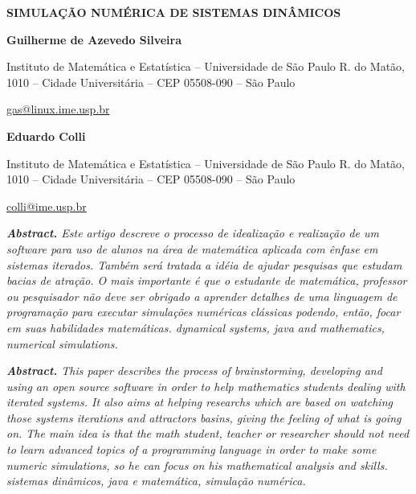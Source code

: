 \documentclass[a4paper,12pt]{article}
\begin{document}
\clearpage\pagestyle{Standard}
{\centering{}\bfseries
SIMULA\c{C}\~AO NUM\'ERICA DE SISTEMAS DIN\^AMICOS
\par}


\bigskip

{\centering{}\bfseries
Guilherme de Azevedo Silveira
\par}

{\centering{}
Instituto de Matem\'atica e Estat\'istica {--} Universidade de S\~ao
Paulo\newline
R. do Mat\~ao, 1010 {--} Cidade Universit\'aria {--} CEP 05508{}-090
{--} S\~ao Paulo
\par}

{\centering{}
\href{mailto:gas@linux.ime.usp.br}{gas@linux.ime.usp.br}
\par}

{\centering{}\bfseries
Eduardo Colli
\par}

{\centering{}
Instituto de Matem\'atica e Estat\'istica {--} Universidade de S\~ao
Paulo\newline
R. do Mat\~ao, 1010 {--} Cidade Universit\'aria {--} CEP 05508{}-090
{--} S\~ao Paulo
\par}

{\centering{}
\href{mailto:colli@ime.usp.br}{\foreignlanguage{english}{colli@ime.usp.br}}
\par}


\bigskip

{\itshape
\textbf{Abstract. }\textmd{Este artigo descreve o processo de
idealiza\c{c}\~ao e realiza\c{c}\~ao de um software para uso de alunos
na \'area de matem\'atica aplicada com \^enfase em sistemas iterados.
Tamb\'em ser\'a tratada a id\'eia de ajudar pesquisas que estudam
bacias de atra\c{c}\~ao. O mais importante \'e que o estudante de
matem\'atica, professor ou pesquisador n\~ao deve ser obrigado a
aprender detalhes de uma linguagem de programa\c{c}\~ao para executar
simula\c{c}\~oes num\'ericas cl\'assicas podendo, ent\~ao, focar em
suas habilidades matem\'aticas. dynamical systems, java and
mathematics, numerical simulations.}}

{\itshape
\textbf{Abstract. }This paper describes the process of brainstorming,
developing and using an open source software in order to help
mathematics students dealing with iterated systems. It also aims at
helping researchs which are based on watching those
system{\textquotesingle}s iterations and attractors basins, giving the
feeling of what is going on. The main idea is that the math student,
teacher or researcher should not need to learn advanced topics of a
programming language in order to make some numeric simulations, so he
can focus on his mathematical analysis and skills. sistemas
din\^amicos, java e matem\'atica, simula\c{c}\~ao num\'erica.}
\end{document}
